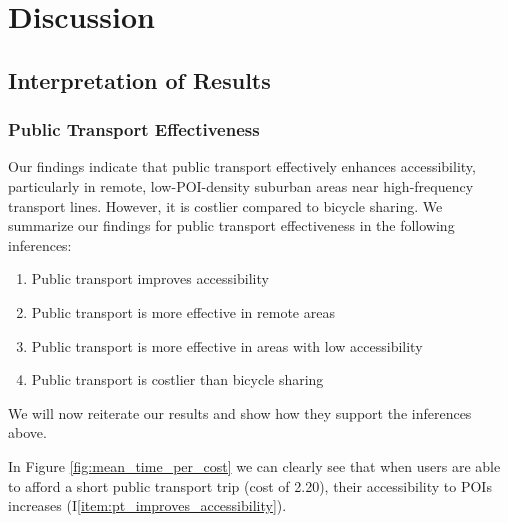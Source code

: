 \clearpage
\section{Discussion}
\label{sec:discussion}

\subsection{Interpretation of Results}


\subsubsection{Public Transport Effectiveness}
Our findings indicate that public transport effectively enhances accessibility, particularly in remote, low-POI-density suburban areas near high-frequency transport lines. 
However, it is costlier compared to bicycle sharing.
We summarize our findings for public transport effectiveness in the following inferences:
\begin{enumerate}
  \renewcommand{\labelenumi}{I\theenumi.}
  \item Public transport improves accessibility \label{item:pt_improves_accessibility}
  \item Public transport is more effective in remote areas \label{item:pt_effective_in_remote_areas}
  \item Public transport is more effective in areas with low accessibility \label{item:pt_effective_in_areas_with_low_accessibility}
  \item Public transport is costlier than bicycle sharing \label{item:pt_costlier_than_bicycle_sharing}
\end{enumerate}
We will now reiterate our results and show how they support the inferences above.

In Figure \ref{fig:mean_time_per_cost} we can clearly see that when users are able to afford a short public transport trip (cost of 2.20), their accessibility to POIs increases (I\ref{item:pt_improves_accessibility}).

